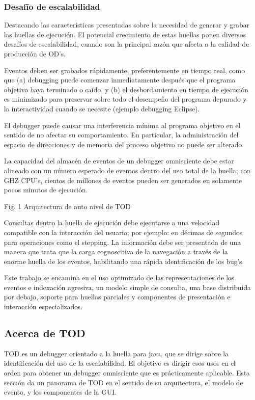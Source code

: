 \documentclass[12pt,legalpaper]{report}
\begin{document}
			\subsubsection{Desafío de escalabilidad}

Destacando las características presentadas sobre la necesidad de generar y grabar las huellas de ejecución.  El potencial crecimiento de estas huellas ponen diversos desafíos de escalabilidad, cuando son la principal razón que afecta a la calidad de producción de OD's.

Eventos deben ser grabados rápidamente, preferentemente en tiempo real, como que  (a) debugging puede comenzar inmediatamente después que el programa objetivo haya terminado o caído, y (b) el desbordamiento en tiempo de ejecución es minimizado para preservar sobre todo el desempeño del programa depurado y la interactividad cuando se necesite (ejemplo debugging Eclipse).

El debugger puede causar una interferencia mínima al programa objetivo en el sentido de no afectar su comportamiento.  En particular, la administración del espacio de direcciones y de memoria del proceso objetivo no puede ser alterado.

La capacidad del almacén de eventos de un debugger omnisciente debe estar alineado con un número esperado de eventos dentro del uso total de la huella; con GHZ CPU's, cientos de millones de eventos pueden ser generados en solamente pocos minutos de ejecución.


Fig. 1 Arquitectura de auto nivel de TOD

Consultas dentro la huella de ejecución debe ejecutarse a una velocidad compatible con la interacción del usuario; por ejemplo: en décimas de segundos para operaciones como el stepping.
La información debe ser presentada de una manera que trata que la carga cognoscitiva de la navegación a través de la enorme huella de los eventos, habilitando una rápida identificación de los bug's.

 	Este trabajo se encamina en el uso optimizado de las representaciones de los eventos e indexación agresiva, un modelo simple de consulta, una base distribuida por debajo, soporte para huellas parciales y componentes de presentación e interacción especializados.

		\subsection{Acerca de TOD}

TOD es un debugger orientado a la huella para java, que se dirige sobre la identificación del uso de la escalabilidad.  El objetivo es dirigir esos usos en el orden para obtener un debugger omnisciente que es prácticamente aplicable.  Esta sección da un panorama de TOD en el sentido de su arquitectura, el modelo de evento, y los componentes de la GUI.
\end{document}
